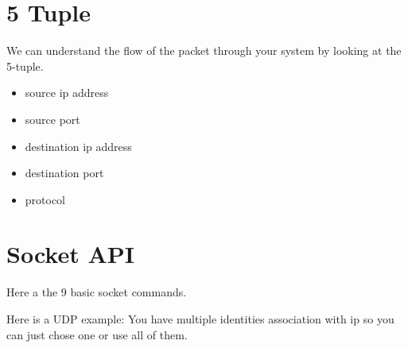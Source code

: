 \documentclass[12pt]{article}
\begin{document}

\section{5 Tuple} %
\label{sec:5_tuple}
We can understand the flow of the packet through your system by looking at the 5-tuple. 
\begin{itemize}
	\item source ip address
	\item source port
	\item destination ip address
	\item destination port
	\item protocol
\end{itemize}
		


\section{Socket API} %
\label{sec:socket_api}
Here a the 9 basic socket commands.

Here is a UDP example:
You have multiple identities association with ip so you can just chose one or use all of them. 
\end{document}
